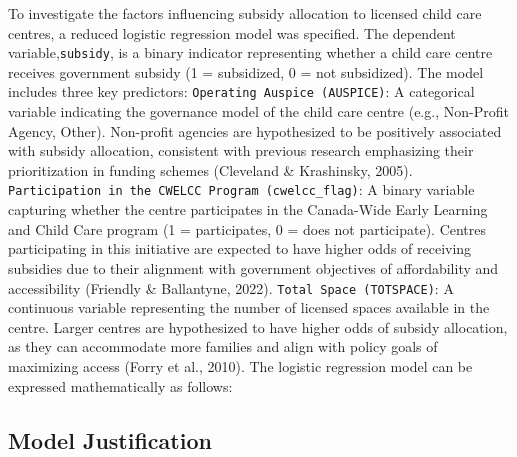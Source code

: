 \documentclass[
  letterpaper,
  DIV=11,
  numbers=noendperiod]{scrartcl}
\begin{document}
To investigate the factors influencing subsidy allocation to licensed
child care centres, a reduced logistic regression model was specified.
The dependent variable,\texttt{subsidy}, is a binary indicator
representing whether a child care centre receives government subsidy (1
= subsidized, 0 = not subsidized). The model includes three key
predictors: \texttt{Operating\ Auspice\ (AUSPICE)}: A categorical
variable indicating the governance model of the child care centre (e.g.,
Non-Profit Agency, Other). Non-profit agencies are hypothesized to be
positively associated with subsidy allocation, consistent with previous
research emphasizing their prioritization in funding schemes (Cleveland
\& Krashinsky, 2005).
\texttt{Participation\ in\ the\ CWELCC\ Program\ (cwelcc\_flag)}: A
binary variable capturing whether the centre participates in the
Canada-Wide Early Learning and Child Care program (1 = participates, 0 =
does not participate). Centres participating in this initiative are
expected to have higher odds of receiving subsidies due to their
alignment with government objectives of affordability and accessibility
(Friendly \& Ballantyne, 2022). \texttt{Total\ Space\ (TOTSPACE)}: A
continuous variable representing the number of licensed spaces available
in the centre. Larger centres are hypothesized to have higher odds of
subsidy allocation, as they can accommodate more families and align with
policy goals of maximizing access (Forry et al., 2010). The logistic
regression model can be expressed mathematically as follows:

\subsection{Model Justification}\label{model-justification}
\end{document}
